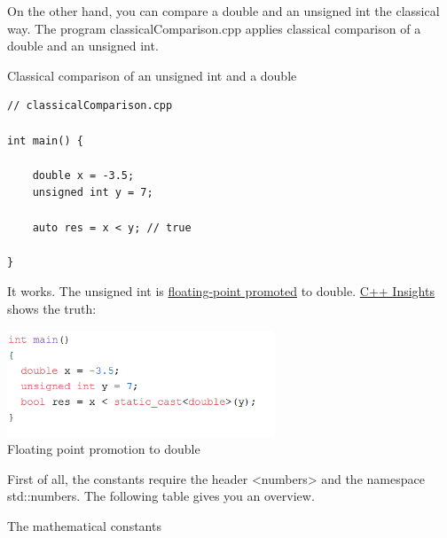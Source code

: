 On the other hand, you can compare a double and an unsigned int the classical way. The program classicalComparison.cpp applies classical comparison of a double and an unsigned int.

\noindent
Classical comparison of an unsigned int and a double
\begin{lstlisting}[style=styleCXX]
// classicalComparison.cpp

int main() {
	
	double x = -3.5;
	unsigned int y = 7;
	
	auto res = x < y; // true
	
}
\end{lstlisting}

It works. The unsigned int is \href{https://en.cppreference.com/w/cpp/language/implicit_conversion}{floating-point promoted} to double. \href{https://cppinsights.io/s/44216566}{C++ Insights} shows the truth:

\begin{center}
\includegraphics[width=0.6\textwidth]{content/3/chapter5/images/1-5.png}\\
Floating point promotion to double
\end{center}


First of all, the constants require the header <numbers> and the namespace std::numbers. The following table gives you an overview.

\begin{center}
The mathematical constants
\end{center}

